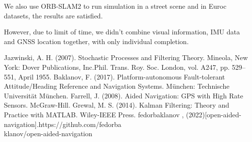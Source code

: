 \documentclass[conference]{IEEEtran}
\begin{document}
We also use ORB-SLAM2 to run simulation in a street scene and in Euroc datasets, the results are satisfied.

However, due to limit of time, we didn't combine visual information, IMU data and GNSS location together, with only individual completion.

% 
% 

\begin{thebibliography}{00}
 Jazwinski, A. H. (2007). Stochastic Processes and Filtering Theory. Mineola, New York: Dover Publications, Inc.Phil. Trans. Roy. Soc. London, vol. A247, pp. 529--551, April 1955.
 Baklanov, F. (2017). Platform-autonomous Fault-tolerant Attitude/Heading Reference and Navigation Systems. München: Technische Universität München.
 Farrell, J. (2008). Aided Navigation: GPS with High Rate Sensors. McGraw-Hill.
 Grewal, M. S. (2014). Kalman Filtering: Theory and Practice with MATLAB. Wiley-IEEE Press.
 fedorbaklanov , (2022)[open-aided-navigation].https://github.com/fedorba \\
klanov/open-aided-navigation
\end{thebibliography}
\vspace{12pt}
\end{document}
